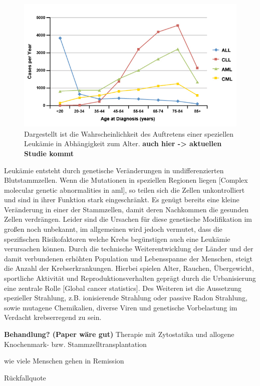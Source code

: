 \begin{figure}
\centering
\includegraphics[width=.95\textwidth]{images/Age_AML_ALL.jpg}
\caption{Dargestellt ist die Wahrscheinlichkeit des Auftretens einer speziellen Leukämie in Abhängigkeit zum Alter. \textbf{auch hier -> aktuellen Studie kommt}}
\label{fig:Age_AML_ALL}
\end{figure}

Leukämie entsteht durch genetische Veränderungen in undifferenzierten Blutstammzellen. Wenn die Mutationen in speziellen Regionen liegen [Complex molecular genetic abnormalities in aml], so teilen sich die Zellen unkontrolliert und sind in ihrer Funktion stark eingeschränkt. Es genügt bereits eine kleine Veränderung in einer der Stammzellen, damit deren Nachkommen die gesunden Zellen verdrängen. Leider sind die Ursachen für diese genetische Modifikation im großen noch unbekannt, im allgemeinen wird jedoch vermutet, dass die spezifischen Risikofaktoren welche Krebs begünstigen auch eine Leukämie verursachen können. Durch die technische Weiterentwicklung der Länder und der damit verbundenen erhöhten Population und Lebensspanne der Menschen, steigt die Anzahl der Krebserkrankungen. Hierbei spielen Alter, Rauchen, Übergewicht, sportliche Aktivität und Reproduktionsverhalten geprägt durch die Urbanisierung eine zentrale Rolle [Global cancer statistics]. Des Weiteren ist die Aussetzung spezieller Strahlung, z.B. ionisierende Strahlung oder passive Radon Strahlung, sowie mutagene Chemikalien, diverse Viren und genetische Vorbelastung im Verdacht krebserregend zu sein.

\textbf{Behandlung? (Paper wäre gut)}
Therapie mit Zytostatika und allogene Knochenmark- bzw. Stammzelltransplantation

wie viele Menschen gehen in Remission 

Rückfallquote


